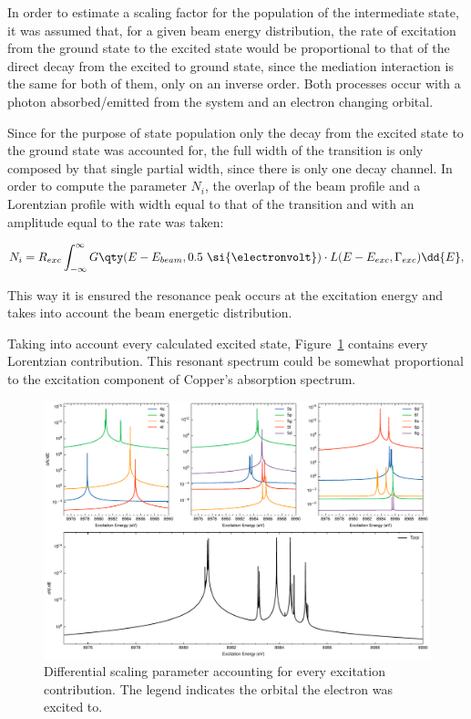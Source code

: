 In order to estimate a scaling factor for the population of the intermediate state, it was assumed that, for a given beam energy distribution, the rate of excitation from the ground state to the excited state would be proportional to that of the direct decay from the excited to ground state, since the mediation interaction is the same for both of them, only on an inverse order. Both processes occur with a photon absorbed/emitted  from the system and an electron changing orbital.

Since for the purpose of  state population only the decay from the excited state to the ground state was accounted for, the full width of the transition is only composed by that single partial width, since there is only one decay channel. In order to compute the parameter $N_i$, the overlap of the beam profile and a Lorentzian profile with width equal to that of the transition and with an amplitude equal to the rate was taken:

\begin{equation}
    N_i =R_{exc} \int_{-\infty}^\infty G\qty(E-E_{beam},0.5\ \si{\electronvolt})\cdot L(E-E_{exc},\Gamma_{exc}) \dd{E},
\end{equation}

This way it is ensured the resonance peak occurs at the excitation energy and takes into account the beam energetic distribution.

Taking into account every calculated excited state, Figure~\ref{fig:absorption} contains every Lorentzian contribution. This resonant spectrum could be somewhat proportional to the excitation component of Copper's absorption spectrum. 


\begin{figure}[h!]
    \centering
    \includegraphics[width=\linewidth]{Chapters/Figures/Chapter4/absorption.pdf}
    \caption{Differential scaling parameter accounting for every excitation contribution. The legend indicates the orbital the electron was excited to.}\label{fig:absorption}
\end{figure}





